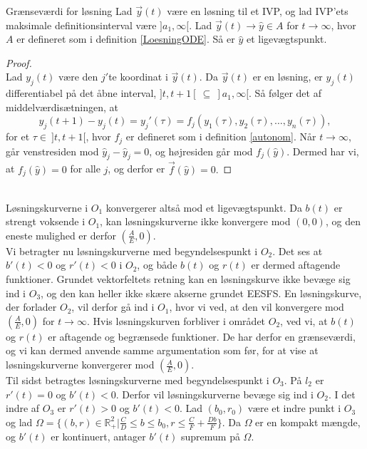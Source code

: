 \begin{lemma}{Grænseværdi for løsning \citep[s. 253]{Svensk}}{}
Lad $\vec{y}(t)$ være en løsning til et IVP, og lad IVP'ets maksimale definitionsinterval være $]a_1,\infty[$. Lad $\vec{y}(t)\to \hat{y}\in A$ for $t\to \infty$, hvor $A$ er defineret som i definition \ref{LoesningODE}. Så er $\hat{y}$ et ligevægtspunkt.
\end{lemma}
\begin{proof}\\
Lad $y_j(t)$ være den $j'$te koordinat i $\vec{y}(t)$. Da $\vec{y}(t)$ er en løsning, er $y_j(t)$ differentiabel på det åbne interval, $]t,t+1[ \ \subseteq \ ]a_1,\infty[$. Så følger det af middelværdisætningen, at
$$y_j(t+1)-y_j(t)= y_j'(\tau)=f_j(y_1(\tau),y_2(\tau),\hdots,y_n(\tau)),$$
 for et $\tau\in \ ]t,t+1[$, hvor $f_j$ er defineret som i definition \ref{autonom}. Når $t\to \infty$, går venstresiden mod $\hat{y}_j-\hat{y}_j=0$, og højresiden går mod $f_j(\hat{y})$. Dermed har vi, at $f_j(\hat{y})=0$ for alle $j$, og derfor er $\vec{f}(\hat{y})=0.$
\end{proof}\\ 
\hfill \break
Løsningskurverne i $O_1$ konvergerer altså mod et ligevægtspunkt.
Da $b(t)$ er strengt voksende i $O_1$, kan løsningskurverne ikke konvergere mod $(0,0)$, og den eneste mulighed er derfor $(\frac{A}{E},0)$.\\ 
\hfill \break
Vi betragter nu løsningskurverne med begyndelsespunkt i $O_2$. Det ses at $b'(t)< 0$ og $r'(t)<0$ i $O_2$, og både $b(t)$ og $r(t)$ er dermed aftagende funktioner. Grundet vektorfeltets retning kan en løsningskurve ikke bevæge sig ind i $O_3$, og den kan heller ikke skære akserne grundet EESFS. En løsningskurve, der forlader $O_2$, vil derfor gå ind i $O_1$, hvor vi ved, at den vil konvergere mod $(\frac{A}{E},0)$ for $t \to \infty$. Hvis løsningskurven forbliver i området $O_2$, ved vi, at $b(t)$ og $r(t)$ er aftagende og begrænsede funktioner. De har derfor en grænseværdi, og vi kan dermed anvende samme argumentation som før, for at vise at løsningskurverne konvergerer mod $(\frac{A}{E},0)$. \\ 
\hfill \break 
Til sidst betragtes løsningskurverne med begyndelsespunkt i $O_3$. På $l_2$ er $r'(t)=0$ og $b'(t)<0$. Derfor vil løsningskurverne bevæge sig ind i $O_2$. I det indre af $O_3$ er $r'(t)>0$ og $b'(t)<0$. Lad $(b_0,r_0)$ være et indre punkt i $O_3$ og lad $\Omega = \{(b,r) \in \mathbb{R}_+^2 | \frac{C}{D} \leq b \leq b_0, r \leq \frac{C}{F}+ \frac{Db}{F} \} $. Da $\Omega$ er en kompakt mængde, og $b'(t)$ er kontinuert, antager $b'(t)$ supremum på $\Omega$.

